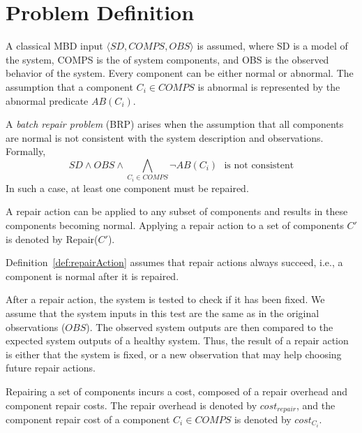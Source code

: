 

\section{Problem Definition}
A classical MBD input $\langle SD,COMPS,OBS \rangle$ is assumed, where SD is a model of the system, COMPS is the of system components, and OBS is the observed behavior of the system. %
Every component can be either normal or abnormal. %
The assumption that a component $C_i\in COMPS$ is abnormal is represented by the abnormal predicate $AB(C_i)$.

\noindent A {\em batch repair problem} (BRP) arises when the assumption that all components are normal is not consistent with the system description and observations. Formally,
\[ SD \wedge OBS \wedge \bigwedge_{C_i\in COMPS} \neg AB(C_i) ~~~ \text{is not consistent} \]
\noindent In such a case, at least one component must be repaired.

\begin{definition}
A repair action can be applied to any subset of components and results in these components becoming normal. Applying a repair action to a set of components $C'$ is denoted by Repair($C'$).
\label{def:repairAction}
\end{definition}
Definition~\ref{def:repairAction} assumes that repair actions always succeed, i.e., a component is normal after it is repaired. %

After a repair action, the system is tested to check if it has been fixed.
We assume that the system inputs in this test are the same as in the original observations ($OBS$). The observed system outputs are then compared to the expected system outputs of a healthy system. Thus, the result of a repair action is either that the system is fixed, or a new observation that may help choosing future repair actions.

Repairing a set of components incurs a cost, composed of a repair overhead and component repair costs. The repair overhead is denoted by $cost_{repair}$, and the component repair cost of a component $C_i\in COMPS$ is denoted by $cost_{C_i}$.


